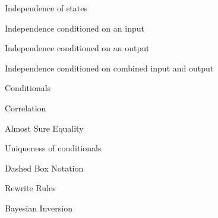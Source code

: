 \begin{frame}{Independence of states}
\end{frame}

\begin{frame}{Independence conditioned on an input}
\end{frame}

\begin{frame}{Independence conditioned on an output}
\end{frame}

\begin{frame}{Independence conditioned on combined input and output}
\end{frame}

\begin{frame}{Conditionals}
\end{frame}

\begin{frame}{Correlation}
\end{frame}

\begin{frame}{Almost Sure Equality}
\end{frame}

\begin{frame}{Uniqueness of conditionals}
\end{frame}

\begin{frame}{Dashed Box Notation}
\end{frame}

\begin{frame}{Rewrite Rules}
\end{frame}

\begin{frame}{Bayesian Inversion}
\end{frame}
